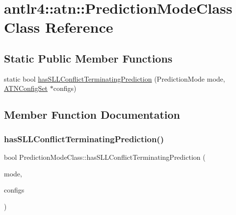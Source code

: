 \hypertarget{classantlr4_1_1atn_1_1PredictionModeClass}{}\section{antlr4\+:\+:atn\+:\+:Prediction\+Mode\+Class Class Reference}
\label{classantlr4_1_1atn_1_1PredictionModeClass}
\subsection*{Static Public Member Functions}
\begin{DoxyCompactItemize}
\item 
static bool \hyperlink{classantlr4_1_1atn_1_1PredictionModeClass_aac21971225a47c6c3ee7bc0148567d6e}{has\+S\+L\+L\+Conflict\+Terminating\+Prediction} (Prediction\+Mode mode, \hyperlink{classantlr4_1_1atn_1_1ATNConfigSet}{A\+T\+N\+Config\+Set} $\ast$configs)
\end{DoxyCompactItemize}


\subsection{Member Function Documentation}
\mbox{\label{classantlr4_1_1atn_1_1PredictionModeClass_aac21971225a47c6c3ee7bc0148567d6e}} 
\subsubsection{\texorpdfstring{has\+S\+L\+L\+Conflict\+Terminating\+Prediction()}{hasSLLConflictTerminatingPrediction()}}
{\footnotesize\ttfamily bool Prediction\+Mode\+Class\+::has\+S\+L\+L\+Conflict\+Terminating\+Prediction (\begin{DoxyParamCaption}\item[{Prediction\+Mode}]{mode,  }\item[{\hyperlink{classantlr4_1_1atn_1_1ATNConfigSet}{A\+T\+N\+Config\+Set} $\ast$}]{configs }\end{DoxyParamCaption})\hspace{0.3cm}{\ttfamily [static]}}

